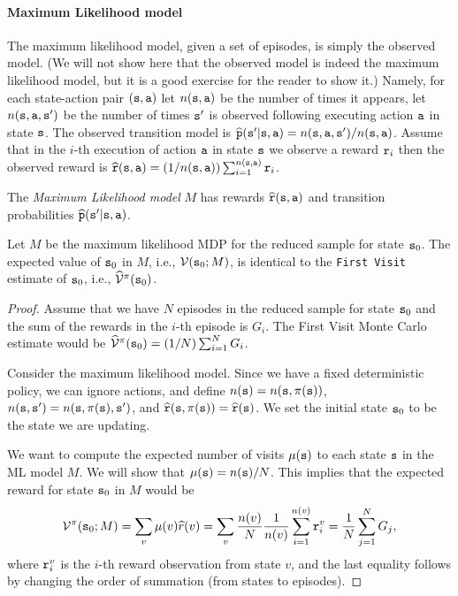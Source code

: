 \begin{advanced}
\paragraph{Maximum Likelihood model} The maximum likelihood model, given a set of episodes, is simply the
observed model. (We will not show here that the observed model is
indeed the maximum likelihood model, but it is a good exercise for the reader to show it.) 
Namely, for each state-action
pair $({\tt s},{\tt a})$ let $n({\tt s},{\tt a})$ be the number of
times it appears, let $n({\tt s},{\tt a},{\tt s}')$ be the number of
times ${\tt s}'$ is observed following executing action ${\tt a}$ in
state ${\tt s}$. The observed transition model is
$\widehat{{\tt p}}({\tt s}'|{\tt s},{\tt a})=n({\tt s},{\tt a},{\tt s}')/n({\tt s},{\tt a})$.
Assume that in the $i$-th execution of action ${\tt a}$ in state
${\tt s}$ we observe a reward ${\tt r}_i$ then the observed reward is
$\widehat{{\tt r}}({\tt s},{\tt a})=(1/n({\tt s},{\tt a}))\sum_{i=1}^{n({\tt s},{\tt a})}
{\tt r}_i$.

\begin{definition}
\label{model:ML}
The \emph{Maximum Likelihood model} $M$ has rewards $\widehat{{\tt r}}({\tt s},{\tt a})$ and transition probabilities $\widehat{{\tt p}}({\tt s}'|{\tt s},{\tt a})$.
\end{definition}

\begin{theorem}
\label{thm:MC-ML}
%
Let $M$ be the maximum likelihood MDP for the reduced sample for state ${\tt s}_0$. The
expected value of ${\tt s}_0$ in $M$, i.e., $\mathcal{V}({\tt s}_0;M)$, is
identical to the {\tt First Visit} estimate of ${\tt s}_0$, i.e.,
$\widehat{\mathcal{V}}^\pi({\tt s}_0)$.
\end{theorem}

\begin{proof}
Assume that we have $N$ episodes in the reduced sample for state ${\tt s}_0$ and the sum
of the rewards in the $i$-th episode is $G_i$. The First Visit Monte
Carlo estimate would be
$\widehat{\mathcal{V}}^\pi({\tt s}_0)=(1/N)\sum_{i=1}^N G_i$.

Consider the maximum likelihood model. Since we have a fixed
deterministic policy, we can ignore actions, and define
$n({\tt s})=n({\tt s},\pi({\tt s}))$, $n({\tt s}, {\tt s}')=n({\tt s},\pi({\tt s}), {\tt s}')$, and
$\widehat{{\tt r}}({\tt s},\pi({\tt s}))=\widehat{{\tt r}}({\tt s})$.
We set the initial state ${\tt s}_0$ to be the state we are updating.

We want to compute the expected number of visits $\mu({\tt s})$ to
each state ${\tt s}$ in the ML model $M$. We will show that
$\mu({\tt s})=n({\tt s})/N$. This implies that the expected reward for
state ${\tt s}_0$ in $M$ would be
\[
\mathcal{V}^\pi({\tt s}_0;M)=\sum_v \mu(v) \widehat{r}(v)=\sum_v
\frac{n(v)}{N}\frac{1}{n(v)}\sum_{i=1}^{n(v)} {\tt r}_i^v =
\frac{1}{N}\sum_{j=1}^N G_j,
\]
where ${\tt r}_i^v$ is the $i$-th reward observation from state $v$, and the last equality follows by changing the order of summation
(from states to episodes).


\end{proof}
\end{advanced}
